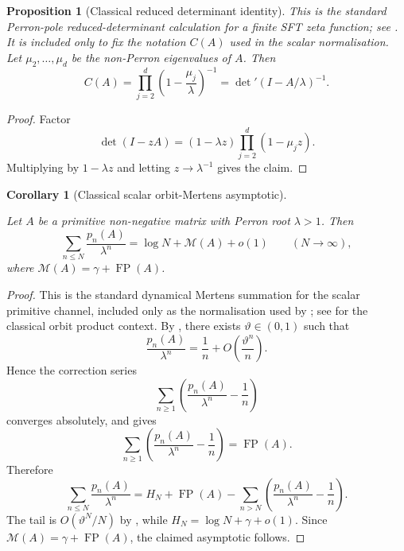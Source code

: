 \documentclass[11pt,a4paper]{amsart}
\theoremstyle{plain}
\newtheorem{proposition}[theorem]{Proposition}
\newtheorem{corollary}[theorem]{Corollary}
\theoremstyle{definition}
\theoremstyle{remark}
\DeclareMathOperator{\FP}{FP}
\begin{document}
\begin{proposition}[Classical reduced determinant identity]
  \label{prop:finite-part-residue-reduced-determinant}
  This is the standard Perron-pole reduced-determinant calculation for a
  finite SFT zeta function; see
  \cite{BowenLanford1970Zeta,LindMarcus1995,ParryPollicott1990Zeta}.  It
  is included only to fix the notation \(C(A)\) used in the scalar
  normalisation.
  Let \(\mu_2,\dots,\mu_d\) be the non-Perron eigenvalues of \(A\). Then
  \[
    C(A)
    =\prod_{j=2}^d\left(1-\frac{\mu_j}{\lambda}\right)^{-1}
    =\det\nolimits'(I-A/\lambda)^{-1}.
  \]
\end{proposition}

\begin{proof}
  Factor
  \[
    \det(I-zA)
    =(1-\lambda z)\prod_{j=2}^d(1-\mu_j z).
  \]
  Multiplying by \(1-\lambda z\) and letting \(z\to\lambda^{-1}\) gives
  the claim.
\end{proof}

\begin{corollary}[Classical scalar orbit-Mertens asymptotic]
  \label{cor:finite-part-mertens-asymptotic}
  \leavevmode\par\noindent
  Let \(A\) be a primitive non-negative matrix with Perron root
  \(\lambda>1\). Then
  \[
    \sum_{n\le N}\frac{p_n(A)}{\lambda^n}
    =\log N+\mathcal M(A)+o(1)
    \qquad (N\to\infty),
  \]
  where \(\mathcal M(A)=\gamma+\FP(A)\).
\end{corollary}

\begin{proof}
  This is the standard dynamical Mertens summation for the scalar
  primitive channel, included only as the normalisation used by
  ; see
  \cite{Sharp1991Mertens,ParryPollicott1990Zeta} for the classical orbit
  product context.
  By , there exists
  \(\vartheta\in(0,1)\) such that
  \[
    \frac{p_n(A)}{\lambda^n}
    =
    \frac{1}{n}+O\!\left(\frac{\vartheta^n}{n}\right).
  \]
  Hence the correction series
  \[
    \sum_{n\ge 1}\left(\frac{p_n(A)}{\lambda^n}-\frac{1}{n}\right)
  \]
  converges absolutely, and  gives
  \[
    \sum_{n\ge 1}\left(\frac{p_n(A)}{\lambda^n}-\frac{1}{n}\right)
    =
    \FP(A).
  \]
  Therefore
  \[
    \sum_{n\le N}\frac{p_n(A)}{\lambda^n}
    =
    H_N+\FP(A)
    -\sum_{n>N}\left(\frac{p_n(A)}{\lambda^n}-\frac{1}{n}\right).
  \]
  The tail is \(O(\vartheta^N/N)\) by
  , while
  \(H_N=\log N+\gamma+o(1)\). Since \(\mathcal M(A)=\gamma+\FP(A)\),
  the claimed asymptotic follows.
\end{proof}
\end{document}
